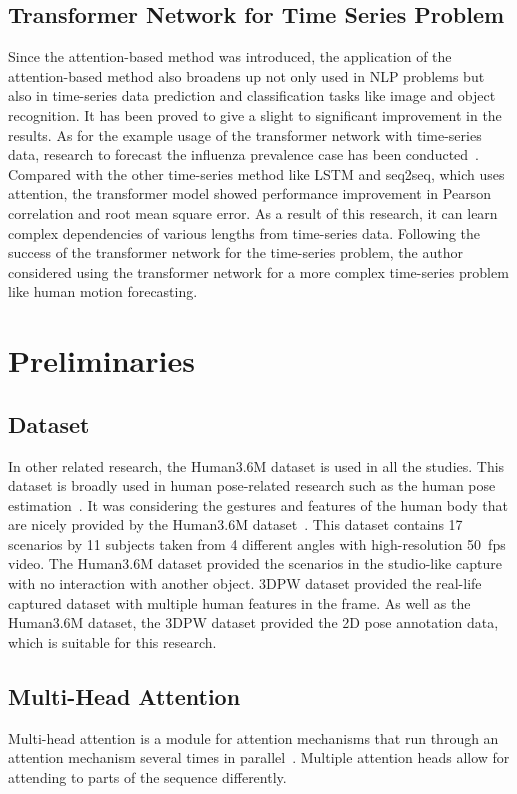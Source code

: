 \subsection{Transformer Network for Time Series Problem}
Since the attention-based method was introduced, the application of the attention-based method also broadens up not only used in NLP problems but also in time-series data prediction and classification tasks like image and object recognition. It has been proved to give a slight to significant improvement in the results. As for the example usage of the transformer network with time-series data, research to forecast the influenza prevalence case has been conducted~\cite{neo2020}.
Compared with the other time-series method like LSTM and seq2seq, which uses attention, the transformer model showed performance improvement in Pearson correlation and root mean square error.
As a result of this research, it can learn complex dependencies of various lengths from time-series data. Following the success of the transformer network for the time-series problem, the author considered using the transformer network for a more complex time-series problem like human motion forecasting. 


\section{Preliminaries}
\subsection{Dataset}
In other related research, the Human3.6M dataset is used in all the studies. This dataset is broadly used in human pose-related research such as the human pose estimation~\cite{zanfir2018, iskakov2019}. It was considering the gestures and features of the human body that are nicely provided by the Human3.6M dataset~\cite{human3.6m}. This dataset contains 17 scenarios by 11 subjects taken from 4 different angles with high-resolution 50~fps video. The Human3.6M dataset provided the scenarios in the studio-like capture with no interaction with another object. 3DPW dataset provided the real-life captured dataset with multiple human features in the frame\cite{vonMarcard2018}. As well as the Human3.6M dataset, the 3DPW dataset provided the 2D pose annotation data, which is suitable for this research. 


\subsection{Multi-Head Attention}
Multi-head attention is a module for attention mechanisms that run through an attention mechanism several times in parallel~\cite{vaswani2017}. Multiple attention heads allow for attending to parts of the sequence differently.

